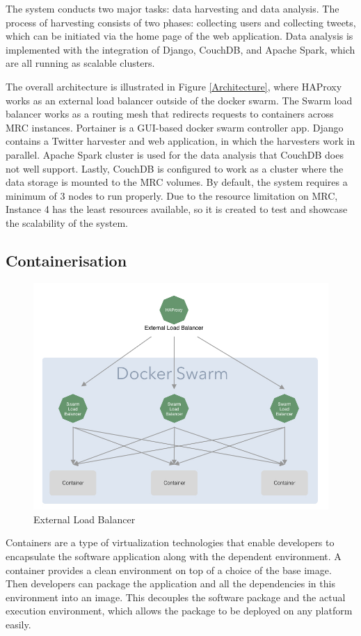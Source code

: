 The system conducts two major tasks: data harvesting and data analysis. The process of harvesting consists of two phases: collecting users and collecting tweets, which can be initiated via the home page of the web application. Data analysis is implemented with the integration of Django, CouchDB, and Apache Spark, which are all running as scalable clusters.

The overall architecture is illustrated in Figure \ref{Architecture}, where HAProxy works as an external load balancer outside of the docker swarm. The Swarm load balancer works as a routing mesh that redirects requests to containers across MRC instances. Portainer is a GUI-based docker swarm controller app. Django contains a Twitter harvester and web application, in which the harvesters work in parallel. Apache Spark cluster is used for the data analysis that CouchDB does not well support. Lastly, CouchDB is configured to work as a cluster where the data storage is mounted to the MRC volumes. By default, the system requires a minimum of 3 nodes to run properly. Due to the resource limitation on MRC, Instance 4 has the least resources available, so it is created to test and showcase the scalability of the system.

\subsection{Containerisation}
\begin{figure}
\centering
\includegraphics[width=6in]{Figures/Network.jpg}
\caption{External Load Balancer}
\label{External Load Balancer}
\vspace{-0.5cm}
\end{figure}
Containers are a type of virtualization technologies that enable developers to encapsulate the software application along with the dependent environment. A container provides a clean environment on top of a choice of the base image. Then developers can package the application and all the dependencies in this environment into an image. This decouples the software package and the actual execution environment, which allows the package to be deployed on any platform easily. 

